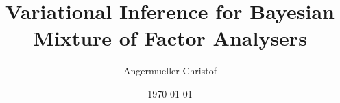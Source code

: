 \documentclass[a4paper]{article}
\author{Angermueller Christof}
\date{\today}
\title{Variational Inference for Bayesian Mixture of Factor Analysers}
\begin{document}
\maketitle

\newcommand{\bs}{\boldsymbol}
\newcommand{\Xp}{\bs{\pi}}
\newcommand{\Xbl}{\bar{\Lambda^s}}
\newcommand{\Xn}{\bs{\nu}^s}
\newcommand{\Xe}{\Psi}
\newcommand{\Xa}{\alpha}
\newcommand{\Xc}{\Xl{\Xl}^T}

\newcommand{\Xl}{\Lambda^s}
\newcommand{\Xlmp}{\bar{\bs{\Lambda}}^s_p}
\newcommand{\Xlvp}{\Sigma^{p,s}}
\newcommand{\Xlvpi}{\Xlvp{}^{-1}}
\newcommand{\Xlvpll}{\Xlvp_{\Lambda\Lambda}}
\newcommand{\Xlvplu}{\Xlvp_{\Lambda\mu}}
\newcommand{\Xlvpul}{\Xlvp_{\mu\Lambda}}
\newcommand{\Xlvpuu}{\Xlvp_{\mu\mu}}
\newcommand{\Xlvplli}{\Xlvpll{}^{-1}}
\newcommand{\Xlvplui}{\Xlvplu{}^{-1}}
\newcommand{\Xlvpuli}{\Xlvpul{}^{-1}}
\newcommand{\Xlvpuui}{\Xlvpuu{}^{-1}}
\newcommand{\Xlt}{\tilde{\Lambda}^s}
\newcommand{\Xltb}{\tilde{{\bs{\Lambda}}}^s}
\newcommand{\Xltp}{\tilde{\bs{\Lambda}}^s_p}
\newcommand{\Xltpq}{\tilde{\Lambda}^s_{pq}}
\newcommand{\Xltm}{\bar{\tilde{\Lambda}}^s}
\newcommand{\Xltmp}{\bar{\tilde{\bs{\Lambda}}}^s_p}
\newcommand{\Xltmpq}{\bar{\tilde{\Lambda}}^s_{pq}}
\newcommand{\Xltvp}{\tilde{\Gamma}^{p,s}}
\newcommand{\Xltvpi}{\Xltvp{}^{-1}}

\newcommand{\Xu}{\bs{\mu}^s}
\newcommand{\Xup}{\mu^s_p}
\newcommand{\Xum}{\bar{\bs{\mu}}^s}
\newcommand{\Xump}{\bar{\mu}^s_p}

\newcommand{\Xx}{\bs{x}^n}
\newcommand{\Xxm}{\overline{\bs{x}}^{n,s}}
\newcommand{\Xxv}{\Sigma^s}
\newcommand{\Xxt}{\tilde{\bs{x}}^n}
\newcommand{\Xxtq}{\tilde{x}^n_q}
\newcommand{\Xxtm}{\bar{\tilde{\bs{x}}}^n}
\newcommand{\Xxtmq}{\bar{\tilde{x}}^n_q}
\newcommand{\Xxtv}{\tilde{\Sigma}^s}

\newcommand{\Xha}{a^*}
\newcommand{\Xhb}{b^*}
\newcommand{\Xhal}{\alpha^*}
\newcommand{\Xhm}{\bs{m}^*}
\newcommand{\Xhmp}{m^*_p}
\newcommand{\Xhn}{\bs{\nu}^*}
\newcommand{\Xhnp}{\nu^*_p}

\newcommand{\Xsp}{\Sigma^{p,s}}
\newcommand{\Xxs}{\Sigma^s}
\newcommand{\Xlm}{\overline{\Lambda}^s}
\newcommand{\Xls}{\Sigma^{p,s}}
\newcommand{\Xpsii}{\Psi^{-1}}
\newcommand{\Xy}{\bs{y}^n}
\newcommand{\Xs}{s^n}
\newcommand{\Xcov}{\operatorname{cov}}
\newcommand{\Xvar}{\operatorname{var}}
\newcommand{\Xtr}{\operatorname{tr}}
\newcommand{\Xdiag}{\operatorname{diag}}
\newcommand{\Xvec}{\operatorname{vec}}
\end{document}
